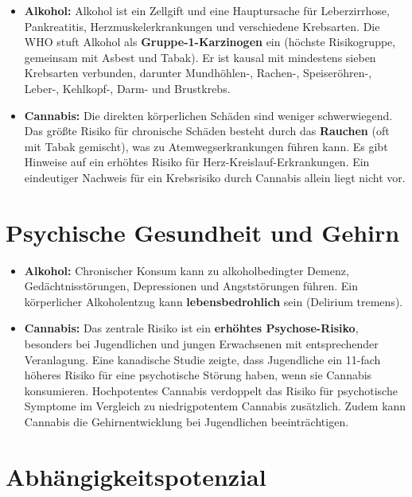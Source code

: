 \documentclass[11pt,a4paper]{article}
\begin{document}
	\begin{itemize}[leftmargin=*, noitemsep]
		\item \textbf{Alkohol:} Alkohol ist ein Zellgift und eine Hauptursache für Leberzirrhose, Pankreatitis, Herzmuskelerkrankungen und verschiedene Krebsarten. Die WHO stuft Alkohol als \textbf{Gruppe-1-Karzinogen} ein (höchste Risikogruppe, gemeinsam mit Asbest und Tabak)\cite{who-carcinogen}. Er ist kausal mit mindestens sieben Krebsarten verbunden, darunter Mundhöhlen-, Rachen-, Speiseröhren-, Leber-, Kehlkopf-, Darm- und Brustkrebs\cite{who-carcinogen}.
		\item \textbf{Cannabis:} Die direkten körperlichen Schäden sind weniger schwerwiegend. Das größte Risiko für chronische Schäden besteht durch das \textbf{Rauchen} (oft mit Tabak gemischt), was zu Atemwegserkrankungen führen kann. Es gibt Hinweise auf ein erhöhtes Risiko für Herz-Kreislauf-Erkrankungen\cite{nida-heart}. Ein eindeutiger Nachweis für ein Krebsrisiko durch Cannabis allein liegt nicht vor.
	\end{itemize}
	
	\section{Psychische Gesundheit und Gehirn}
	
	\begin{itemize}[leftmargin=*, noitemsep]
		\item \textbf{Alkohol:} Chronischer Konsum kann zu alkoholbedingter Demenz, Gedächtnisstörungen, Depressionen und Angststörungen führen. Ein körperlicher Alkoholentzug kann \textbf{lebensbedrohlich} sein (Delirium tremens).
		\item \textbf{Cannabis:} Das zentrale Risiko ist ein \textbf{erhöhtes Psychose-Risiko}, besonders bei Jugendlichen und jungen Erwachsenen mit entsprechender Veranlagung. Eine kanadische Studie zeigte, dass Jugendliche ein 11-fach höheres Risiko für eine psychotische Störung haben, wenn sie Cannabis konsumieren\cite{cannabis-psychosis}. Hochpotentes Cannabis verdoppelt das Risiko für psychotische Symptome im Vergleich zu niedrigpotentem Cannabis zusätzlich\cite{cannabis-high-potency}. Zudem kann Cannabis die Gehirnentwicklung bei Jugendlichen beeinträchtigen.
	\end{itemize}
	
	\section{Abhängigkeitspotenzial}
	
\end{document}
